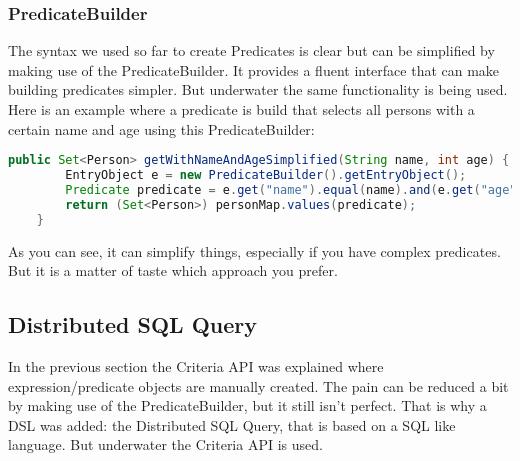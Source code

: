 \subsubsection*{PredicateBuilder}
The syntax we used so far to create Predicates is clear but can be simplified by making use of the PredicateBuilder. It provides a fluent interface that can make building predicates simpler. But underwater the same functionality is being used. Here is an example where a predicate is build that selects all persons with a certain name and age using this PredicateBuilder:
\begin{lstlisting}[language=java]
    public Set<Person> getWithNameAndAgeSimplified(String name, int age) {
        EntryObject e = new PredicateBuilder().getEntryObject();
        Predicate predicate = e.get("name").equal(name).and(e.get("age").equal(age));
        return (Set<Person>) personMap.values(predicate);
    }
\end{lstlisting}
As you can see, it can simplify things, especially if you have complex predicates. But it is a matter of taste which approach you prefer.

\subsection*{Distributed SQL Query}
In the previous section the Criteria API was explained where expression/predicate objects are manually created. The pain can be reduced a bit by making use of the PredicateBuilder, but it still isn't perfect. That is why a DSL was added: the Distributed SQL Query, that is based on a SQL like language. But underwater the Criteria API is used. 

